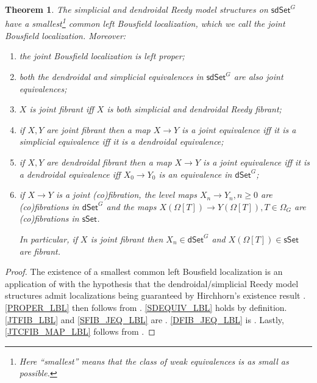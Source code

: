 \documentclass[a4paper,10pt
,draft
]{article}%
\numberwithin{equation}{section}
\numberwithin{figure}{section}
\newtheorem{theorem}[equation]{Theorem}%
\theoremstyle{definition} %
\newcommand{\sSet}{\ensuremath{\mathsf{sSet}}}%
\newcommand{\dSet}{\mathsf{dSet}}
\newcommand{\1}{\ensuremath{\mathbbm 1}}%
\begin{document}
\begin{theorem}\label{JB_THM}
	The simplicial and dendroidal Reedy model structures on 
	$\mathsf{sdSet}^G$
	have a smallest\footnote{Here ``smallest'' means that the class of weak equivalences is as small as possible.}
	common left Bousfield localization,
	which we call the \emph{joint Bousfield localization}.
	Moreover:
\begin{enumerate}[label = (\roman*)]
	\item \label{PROPER_LBL}
	the joint Bousfield localization is left proper;
	\item \label{SDEQUIV_LBL}
	both the dendroidal and simplicial equivalences in $\mathsf{sdSet}^G$ are also joint equivalences;
	\item \label{JTFIB_LBL}
	$X$ is joint fibrant iff $X$ is both simplicial and dendroidal Reedy fibrant;
	\item \label{SFIB_JEQ_LBL} if $X,Y$ are joint fibrant
	then a map $X \to Y$ is a joint equivalence iff it is a simplicial
	equivalence iff it is a dendroidal equivalence;
	\item \label{DFIB_JEQ_LBL} if $X,Y$ are dendroidal fibrant
	then a map $X \to Y$ is a joint equivalence iff 
	it is a dendroidal equivalence iff $X_0 \to Y_0$ is an equivalence in $\mathsf{dSet}^G$;
	\item \label{JTCFIB_MAP_LBL} 
	if $X \to Y$ is a joint (co)fibration,
	the level maps 
	$X_n \to Y_n, n \geq 0$
	are (co)fibrations in $\mathsf{dSet}^G$
	and the maps
	$X\left(\Omega[T]\right) \to Y\left(\Omega[T]\right), T \in \Omega_G$
	are (co)fibrations in $\mathsf{sSet}$.

	In particular, if 
	$X$ is joint fibrant
	then $X_n \in \dSet^G$ and $X(\Omega[T]) \in \sSet$ are fibrant.
\end{enumerate}
\end{theorem}



\begin{proof}
	The existence of a smallest common left Bousfield localization is 
	an application of \cite[Prop. 4.1]{BP_edss}
	with the hypothesis that the dendroidal/simplicial Reedy model structures admit localizations being guaranteed by 
	Hirchhorn's existence result 
	\cite[Thm. 4.1.1]{Hir03}.
	\ref{PROPER_LBL} then follows from \cite[Thm. 4.1.1(3)]{Hir03}.
	\ref{SDEQUIV_LBL} holds by definition.
	\ref{JTFIB_LBL} and \ref{SFIB_JEQ_LBL} are \cite[Prop. 4.1(i)(ii)]{BP_edss}.
	\ref{DFIB_JEQ_LBL} is \cite[Cor. 4.29(iii)]{BP_edss}.
	Lastly, \ref{JTCFIB_MAP_LBL} follows from \cite[Lemmas A.27(i), A.29(i)]{BP_edss}.
\end{proof}
\end{document}
